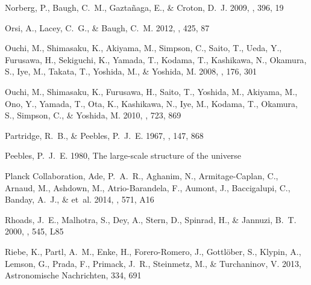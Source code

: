 \documentclass{emulateapj}
\begin{document}
\begin{thebibliography}{43}
{Norberg}, P., {Baugh}, C.~M., {Gazta{\~n}aga}, E., \& {Croton}, D.~J. 2009,
  \mnras, 396, 19

{Orsi}, A., {Lacey}, C.~G., \& {Baugh}, C.~M. 2012, \mnras, 425, 87

{Ouchi}, M., {Shimasaku}, K., {Akiyama}, M., {Simpson}, C., {Saito}, T.,
  {Ueda}, Y., {Furusawa}, H., {Sekiguchi}, K., {Yamada}, T., {Kodama}, T.,
  {Kashikawa}, N., {Okamura}, S., {Iye}, M., {Takata}, T., {Yoshida}, M., \&
  {Yoshida}, M. 2008, \apjs, 176, 301

{Ouchi}, M., {Shimasaku}, K., {Furusawa}, H., {Saito}, T., {Yoshida}, M.,
  {Akiyama}, M., {Ono}, Y., {Yamada}, T., {Ota}, K., {Kashikawa}, N., {Iye},
  M., {Kodama}, T., {Okamura}, S., {Simpson}, C., \& {Yoshida}, M. 2010, \apj,
  723, 869

{Partridge}, R.~B., \& {Peebles}, P.~J.~E. 1967, \apj, 147, 868

{Peebles}, P.~J.~E. 1980, {The large-scale structure of the universe}

{Planck Collaboration}, {Ade}, P.~A.~R., {Aghanim}, N., {Armitage-Caplan}, C.,
  {Arnaud}, M., {Ashdown}, M., {Atrio-Barandela}, F., {Aumont}, J.,
  {Baccigalupi}, C., {Banday}, A.~J., \& et~al. 2014, \aap, 571, A16

{Rhoads}, J.~E., {Malhotra}, S., {Dey}, A., {Stern}, D., {Spinrad}, H., \&
  {Jannuzi}, B.~T. 2000, \apjl, 545, L85

Riebe, K., Partl, A.~M., Enke, H., Forero-Romero, J., Gottlöber, S., Klypin,
  A., Lemson, G., Prada, F., Primack, J.~R., Steinmetz, M., \& Turchaninov, V.
  2013, Astronomische Nachrichten, 334, 691


\end{thebibliography}
\end{document}
